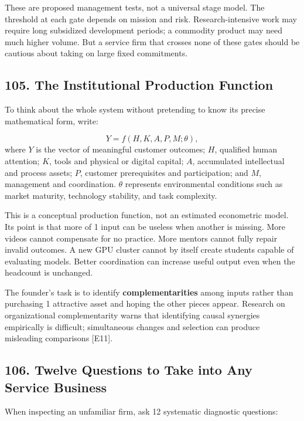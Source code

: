 These are proposed management tests, not a universal stage model. The threshold at each gate depends on mission and risk. Research-intensive work may require long subsidized development periods; a commodity product may need much higher volume. But a service firm that crosses none of these gates should be cautious about taking on large fixed commitments.

\subsection*{105. The Institutional Production Function}

To think about the whole system without pretending to know its precise mathematical form, write:

\begin{equation}
Y = f(H, K, A, P, M; \theta),
\end{equation}
where $Y$ is the vector of meaningful customer outcomes; $H$, qualified human attention; $K$, tools and physical or digital capital; $A$, accumulated intellectual and process assets; $P$, customer prerequisites and participation; and $M$, management and coordination. $\theta$ represents environmental conditions such as market maturity, technology stability, and task complexity.

This is a conceptual production function, not an estimated econometric model. Its point is that more of 1 input can be useless when another is missing. More videos cannot compensate for no practice. More mentors cannot fully repair invalid outcomes. A new GPU cluster cannot by itself create students capable of evaluating models. Better coordination can increase useful output even when the headcount is unchanged.

The founder's task is to identify \textbf{complementarities} among inputs rather than purchasing 1 attractive asset and hoping the other pieces appear. Research on organizational complementarity warns that identifying causal synergies empirically is difficult; simultaneous changes and selection can produce misleading comparisons [E11].

\subsection*{106. Twelve Questions to Take into Any Service Business}

When inspecting an unfamiliar firm, ask 12 systematic diagnostic questions:

